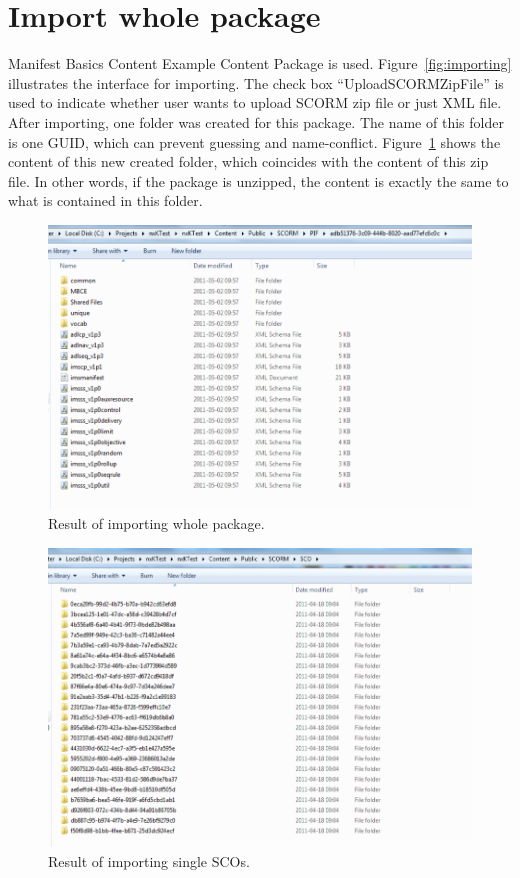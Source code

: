 \section{Import whole package}
Manifest Basics Content Example Content Package \cite{mbce_package} is used. Figure~\ref{fig:importing} illustrates the interface for importing. The 
check box ``UploadSCORMZipFile'' is used to indicate whether user wants to upload SCORM zip file or just XML file. After importing, one folder was 
created for this package. The name of this folder is one GUID, which can prevent guessing and name-conflict. 
Figure~\ref{fig:result_import_whole_package} shows the content of this new created folder, which coincides with the content of this zip file. In 
other words, if the package is unzipped, the content is exactly the same to what is contained in this folder.
\begin{figure}[h]
	\begin{center}
		\includegraphics[scale=0.3]{result_import_whole_package.png}
	\end{center}
	\caption{Result of importing whole package.}
	\label{fig:result_import_whole_package}
\end{figure}
\begin{figure}[h]
	\begin{center}
		\includegraphics[scale=0.3]{result_import_single_scos.png}
	\end{center}
	\caption{Result of importing single SCOs.}
	\label{fig:result_import_single_scos}
\end{figure}
